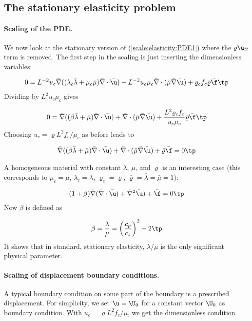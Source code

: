 \documentclass[graybox,envcountchap,sectrefs,final]{svmonodo}
\begin{document}
\subsection{The stationary elasticity problem}
\label{scale:elasticity:stationary}

\paragraph{Scaling of the PDE.}
We now look at the stationary version of
(\ref{scale:elasticity:PDE1}) where the $\varrho\u_{tt}$ term is
removed. The first step in the scaling is just inserting the
dimensionless variables:

\[
0 =
L^{-2}u_c\bar \nabla ((\lambda_c\bar\lambda +
\mu_c\bar\mu)\bar \nabla\cdot\bar \u) +
L^{-2}u_c\mu_c\bar \nabla\cdot(\bar \mu\bar \nabla\bar \u) +
\varrho_cf_c\bar\varrho\bar\f\tp
\]
Dividing by $L^2u_c\mu_c$ gives

\[
0 =
\bar \nabla ((\beta\bar\lambda +
\bar\mu)\bar \nabla\cdot\bar \u) +
\bar \nabla\cdot(\bar \mu\bar \nabla\bar \u) +
\frac{L^2\varrho_cf_c}{u_c\mu_c}\bar\varrho\bar\f\tp
\]
Choosing $u_c = \varrho L^2f_c/\mu_c$ as before leads to

\begin{equation}
\bar \nabla ((\beta\bar\lambda +
\bar\mu)\bar \nabla\cdot\bar \u) +
\bar \nabla\cdot(\bar \mu\bar \nabla\bar \u) +
\bar\varrho\bar\f = 0\tp
\end{equation}

A homogeneous material with constant $\lambda$, $\mu$, and $\varrho$
is an interesting case (this corresponds to $\mu_c=\mu$, $\lambda_c=\lambda$,
$\varrho_c=\varrho$, $\bar\varrho=\bar\lambda=\bar\mu=1$):

\begin{equation}
(1+\beta)\bar \nabla(\bar \nabla\cdot\bar \u) +
\bar \nabla^2\bar \u) +
\bar\f = 0\tp
\end{equation}
Now $\beta$ is defined as

\[ \beta = \frac{\lambda}{\mu} = \left(\frac{c_p}{c_s}\right)^2 - 2\tp\]
It shows that in standard, stationary elasticity, $\lambda/\mu$ is the
only significant physical parameter.

\paragraph{Scaling of displacement boundary conditions.}
A typical boundary condition on some part of the boundary is a prescribed
displacement. For simplicity, we set $\u = \U_0$ for a constant vector
$\U_0$ as boundary condition. With $u_c=\varrho L^2f_c/\mu$, we get
the dimensionless condition
\end{document}

